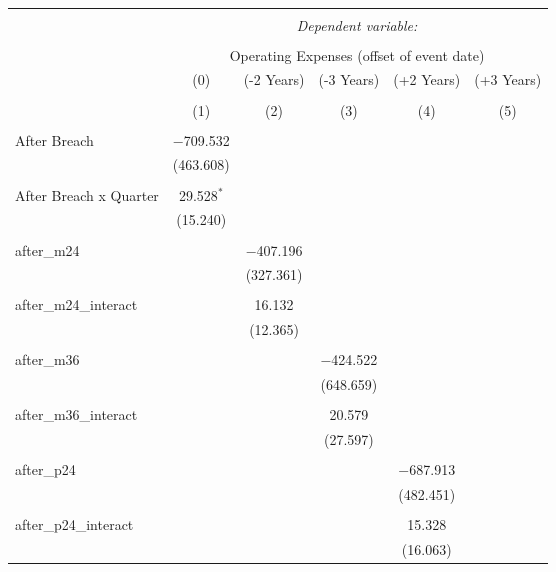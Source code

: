 
\begin{table}[!htbp] \centering 
  \caption{} 
  \label{} 
\begin{tabular}{@{\extracolsep{5pt}}lccccc} 
\\[-1.8ex]\hline 
\hline \\[-1.8ex] 
 & \multicolumn{5}{c}{\textit{Dependent variable:}} \\ 
\cline{2-6} 
\\[-1.8ex] & \multicolumn{5}{c}{Operating Expenses (offset of event date)} \\ 
 & (0) & (-2 Years) & (-3 Years) & (+2 Years) & (+3 Years) \\ 
\\[-1.8ex] & (1) & (2) & (3) & (4) & (5)\\ 
\hline \\[-1.8ex] 
 After Breach & $-$709.532 &  &  &  &  \\ 
  & (463.608) &  &  &  &  \\ 
  & & & & & \\ 
 After Breach x Quarter & 29.528$^{*}$ &  &  &  &  \\ 
  & (15.240) &  &  &  &  \\ 
  & & & & & \\ 
 after\_m24 &  & $-$407.196 &  &  &  \\ 
  &  & (327.361) &  &  &  \\ 
  & & & & & \\ 
 after\_m24\_interact &  & 16.132 &  &  &  \\ 
  &  & (12.365) &  &  &  \\ 
  & & & & & \\ 
 after\_m36 &  &  & $-$424.522 &  &  \\ 
  &  &  & (648.659) &  &  \\ 
  & & & & & \\ 
 after\_m36\_interact &  &  & 20.579 &  &  \\ 
  &  &  & (27.597) &  &  \\ 
  & & & & & \\ 
 after\_p24 &  &  &  & $-$687.913 &  \\ 
  &  &  &  & (482.451) &  \\ 
  & & & & & \\ 
 after\_p24\_interact &  &  &  & 15.328 &  \\ 
  &  &  &  & (16.063) &  \\ 

\end{tabular}
\end{table}
